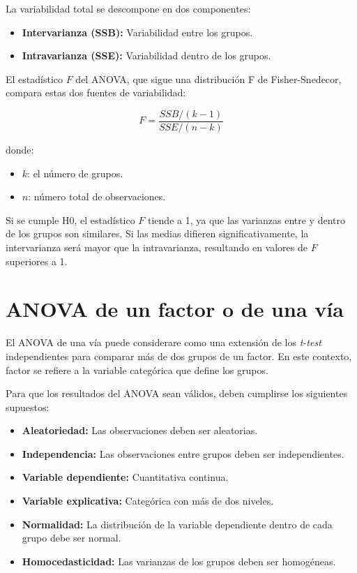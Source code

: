 \documentclass[
  spanish,
  a4paper,
]{scrbook}
\begin{document}
La variabilidad total se descompone en dos componentes:

\begin{itemize}
\item
  \textbf{Intervarianza (SSB):} Variabilidad entre los grupos.
\item
  \textbf{Intravarianza (SSE):} Variabilidad dentro de los grupos.
\end{itemize}

El estadístico \(F\) del ANOVA, que sigue una distribución F de
Fisher-Snedecor, compara estas dos fuentes de variabilidad:

\[
F = \frac{SSB/(k-1)}{SSE/(n-k)}
\]

donde:

\begin{itemize}
\item
  \(k\): el número de grupos.
\item
  \(n\): número total de observaciones.
\end{itemize}

Si se cumple H0, el estadístico \(F\) tiende a 1, ya que las varianzas
entre y dentro de los grupos son similares. Si las medias difieren
significativamente, la intervarianza será mayor que la intravarianza,
resultando en valores de \(F\) superiores a 1.

\section{ANOVA de un factor o de una
vía}\label{anova-de-un-factor-o-de-una-vuxeda}

El ANOVA de una vía puede considerare como una extensión de los
\emph{t-test} independientes para comparar más de dos grupos de un
factor. En este contexto, factor se refiere a la variable categórica que
define los grupos.

Para que los resultados del ANOVA sean válidos, deben cumplirse los
siguientes supuestos:

\begin{itemize}
\item
  \textbf{Aleatoriedad:} Las observaciones deben ser aleatorias.
\item
  \textbf{Independencia:} Las observaciones entre grupos deben ser
  independientes.
\item
  \textbf{Variable dependiente:} Cuantitativa continua.
\item
  \textbf{Variable explicativa:} Categórica con más de dos niveles.
\item
  \textbf{Normalidad:} La distribución de la variable dependiente dentro
  de cada grupo debe ser normal.
\item
  \textbf{Homocedasticidad:} Las varianzas de los grupos deben ser
  homogéneas.
\end{itemize}
\end{document}
